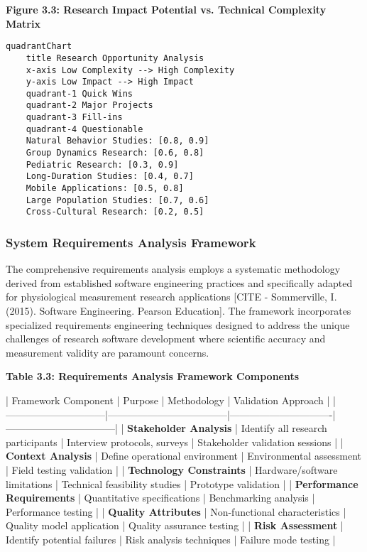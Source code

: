\documentclass[11pt,a4paper]{report}
\begin{document}
\textbf{Figure 3.3: Research Impact Potential vs. Technical Complexity Matrix}

\begin{verbatim}
quadrantChart
    title Research Opportunity Analysis
    x-axis Low Complexity --> High Complexity
    y-axis Low Impact --> High Impact
    quadrant-1 Quick Wins
    quadrant-2 Major Projects
    quadrant-3 Fill-ins
    quadrant-4 Questionable
    Natural Behavior Studies: [0.8, 0.9]
    Group Dynamics Research: [0.6, 0.8]
    Pediatric Research: [0.3, 0.9]
    Long-Duration Studies: [0.4, 0.7]
    Mobile Applications: [0.5, 0.8]
    Large Population Studies: [0.7, 0.6]
    Cross-Cultural Research: [0.2, 0.5]
\end{verbatim}

\subsubsection{System Requirements Analysis Framework}

The comprehensive requirements analysis employs a systematic methodology derived from established software engineering
practices and specifically adapted for physiological measurement research
applications [CITE - Sommerville, I. (2015). Software Engineering. Pearson Education]. The framework incorporates
specialized requirements engineering techniques designed to address the unique challenges of research software
development where scientific accuracy and measurement validity are paramount concerns.

\textbf{Table 3.3: Requirements Analysis Framework Components}

| Framework Component          | Purpose                            | Methodology                   | Validation Approach             |
|------------------------------|------------------------------------|-------------------------------|---------------------------------|
| \textbf{Stakeholder Analysis}     | Identify all research participants | Interview protocols, surveys  | Stakeholder validation sessions |
| \textbf{Context Analysis}         | Define operational environment     | Environmental assessment      | Field testing validation        |
| \textbf{Technology Constraints}   | Hardware/software limitations      | Technical feasibility studies | Prototype validation            |
| \textbf{Performance Requirements} | Quantitative specifications        | Benchmarking analysis         | Performance testing             |
| \textbf{Quality Attributes}       | Non-functional characteristics     | Quality model application     | Quality assurance testing       |
| \textbf{Risk Assessment}          | Identify potential failures        | Risk analysis techniques      | Failure mode testing            |
\end{document}
